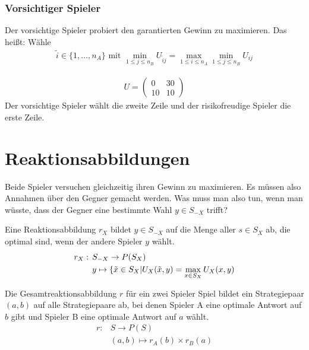 \subsubsection{Vorsichtiger Spieler}
Der vorsichtige Spieler probiert den garantierten Gewinn zu maximieren. Das heißt: Wähle 
\begin{align*}
	\tilde{i} \in \{1, \dots, n_A  \} \text{ mit } \min\limits_{1 \leq j \leq n_B} U_{\tilde{i}j}=\max\limits_{1 \leq i \leq n_A} \min\limits_{1 \leq j \leq n_B} U_{ij}
\end{align*} 

\begin{bsp}[Regenschirm?]
	\begin{align*} U=
		\begin{pmatrix}
			0 & 30 \\ 10 & 10
		\end{pmatrix}
	\end{align*}
	Der vorsichtige Spieler wählt die zweite Zeile und der risikofreudige Spieler die erste Zeile. 
\end{bsp}

\section{Reaktionsabbildungen}
Beide Spieler versuchen gleichzeitig ihren Gewinn zu maximieren. Es müssen also Annahmen über den Gegner gemacht werden. Was muss man also tun, wenn man wüsste, dass der Gegner eine bestimmte Wahl $y \in S_{-X}$ trifft? 

\begin{defi}[Reaktionsabbildung]
	Eine Reaktionsabbildung $r_X$ bildet $y \in S_{-X}$  auf die Menge aller $s \in S_X$ ab, die optimal sind, wenn der andere Spieler $y$ wählt.
	\begin{align*}
		 r_X:\hspace{1ex}&  S_{-X} \rightarrow P(S_X) \\
		& y \mapsto \{\tilde{x} \in S_X | U_X(\tilde{x},y)=\max\limits_{x \in S_X} U_X(x,y)
	\end{align*}
\end{defi}

\begin{defi}[Gesamtreaktionsabbildung]
	Die Gesamtreaktionsabbildung $r$ für ein zwei Spieler Spiel bildet ein Strategiepaar $(a,b)$ auf alle Strategiepaare ab, bei denen Spieler A eine optimale Antwort auf $b$ gibt und Spieler B eine optimale Antwort auf $a$ wählt. 
	\begin{align*}
		r:  & S \rightarrow P(S) \\
			& (a,b) \mapsto r_A(b) \times r_B(a) 
	\end{align*} 
\end{defi}


